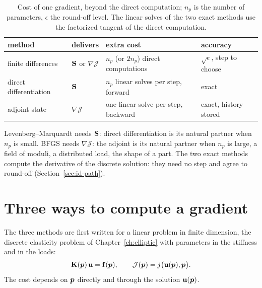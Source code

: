 \begin{table}[h]
\centering\small
\renewcommand{\arraystretch}{1.15}
\begin{tabular}{@{}llll@{}}
\toprule
\sffamily method & \sffamily delivers & \sffamily extra cost & \sffamily accuracy\\
\midrule
finite differences & $\mathbf{S}$ or $\nabla\mathcal J$ & $n_p$ (or $2n_p$) direct computations & $\sqrt{\epsilon}$, step to choose\\
direct differentiation & $\mathbf{S}$ & $n_p$ linear solves per step, forward & exact\\
adjoint state & $\nabla\mathcal J$ & one linear solve per step, backward & exact, history stored\\
\bottomrule
\end{tabular}
\caption{Cost of one gradient, beyond the direct computation; $n_p$ is the
number of parameters, $\epsilon$ the round-off level. The linear solves of the
two exact methods use the factorized tangent of the direct computation.}
\label{tab:id-costs}
\end{table}
\noindent Levenberg--Marquardt needs $\mathbf{S}$: direct differentiation is its
natural partner when $n_p$ is small. BFGS needs $\nabla\mathcal J$: the adjoint is
its natural partner when $n_p$ is large, a field of moduli, a distributed load,
the shape of a part. The two exact methods compute the derivative of the
discrete solution: they need no step and agree to round-off
(Section~\ref{sec:id-path}).

\section{Three ways to compute a gradient}\label{sec:id-grad}
%
The three methods are first written for a linear problem in finite dimension,
the discrete elasticity problem of Chapter~\ref{ch:elliptic} with parameters
in the stiffness and in the loads:
\begin{equation}\label{eq:id-linear}
  \mathbf{K}(\bm{p})\,\mathbf{u}=\mathbf{f}(\bm{p}),\qquad
  \mathcal J(\bm{p})=j\bigl(\mathbf{u}(\bm{p}),\bm{p}\bigr).
\end{equation}
The cost depends on $\bm{p}$ directly and through the solution $\mathbf{u}(\bm{p})$.

